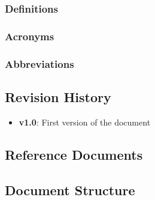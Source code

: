 \subsubsection{Definitions}

\subsubsection{Acronyms}

\subsubsection{Abbreviations}


\subsection{Revision History}
\begin{itemize}
	\item
	\textbf{v1.0}: First version of the document
\end{itemize}


\subsection{Reference Documents}

\subsection{Document Structure}


